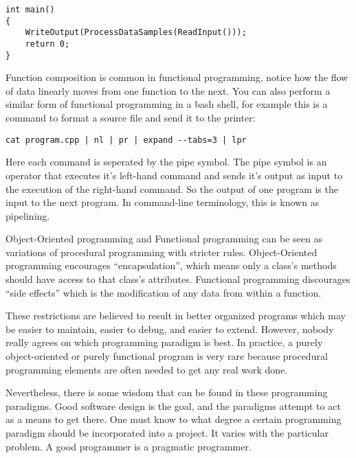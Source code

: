 \documentclass[a4paper,12pt]{article}
\begin{document}
\begin{lstlisting}
int main()
{
	WriteOutput(ProcessDataSamples(ReadInput()));
	return 0;
}
\end{lstlisting}

Function composition is common in functional programming, notice how the flow of data linearly moves from one function to the next. You can also perform a similar form of functional programming in a bash shell, for example this is a command to format a source file and send it to the printer:

\begin{lstlisting}
cat program.cpp | nl | pr | expand --tabs=3 | lpr
\end{lstlisting}

Here each command is seperated by the pipe symbol. The pipe symbol is an operator that executes it's left-hand command and sends it's output as input to the execution of the right-hand command. So the output of one program is the input to the next program. In command-line terminology, this is known as pipelining. 

Object-Oriented programming and Functional programming can be seen as variations of procedural programming with stricter rules. Object-Oriented programming encourages ``encapsulation'', which means only a class's methods should have access to that class's attributes. Functional programming discourages ``side effects'' which is the modification of any data from within a function.

These restrictions are believed to result in better organized programs which may be easier to maintain, easier to debug, and easier to extend. However, nobody really agrees on which programming paradigm is best. In practice, a purely object-oriented or purely functional program is very rare because procedural programming elements are often needed to get any real work done.

Nevertheless, there is some wisdom that can be found in these programming paradigms. Good software design is the goal, and the paradigms attempt to act as a means to get there. One must know to what degree a certain programming paradigm should be incorporated into a project. It varies with the particular problem. A good programmer is a pragmatic programmer. 
\end{document}
